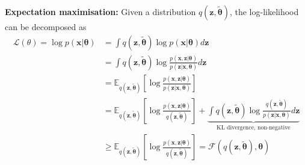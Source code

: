 \documentclass[12pt]{article}
\begin{document}
\textbf{Expectation maximisation:} Given a distribution $q(\boldsymbol{z},\boldsymbol{\tilde{\theta}})$, the log-likelihood can be decomposed as
\begin{align*}
    \mathcal{L}(\theta) = \log p(\boldsymbol{x} | \boldsymbol{\theta}) &= \int q(\boldsymbol{z},\boldsymbol{\tilde{\theta}}) \log p(\boldsymbol{x} | \boldsymbol{\theta}) d\boldsymbol{z} \\
    &= \int q(\boldsymbol{z},\boldsymbol{\tilde{\theta}}) \log \frac{p(\boldsymbol{x}, \boldsymbol{z} | \boldsymbol{\theta})}{p(\boldsymbol{z} | \boldsymbol{x}, \boldsymbol{\theta})} d\boldsymbol{z} \\
    &= \mathbb{E}_{q(\boldsymbol{z},\boldsymbol{\tilde{\theta}})}\left[ \log \frac{p(\boldsymbol{x}, \boldsymbol{z} | \boldsymbol{\theta})}{p(\boldsymbol{z} | \boldsymbol{x}, \boldsymbol{\theta})}\right] \\
    &= \mathbb{E}_{q(\boldsymbol{z},\boldsymbol{\tilde{\theta}})}\left[ \log \frac{p(\boldsymbol{x}, \boldsymbol{z} | \boldsymbol{\theta})}{q(\boldsymbol{z},\boldsymbol{\tilde{\theta}})}\right] + \underbrace{\int q(\boldsymbol{z},\boldsymbol{\tilde{\theta}}) \log \frac{q(\boldsymbol{z},\boldsymbol{\tilde{\theta}})}{p(\boldsymbol{z} | \boldsymbol{x}, \boldsymbol{\theta})} d\boldsymbol{z}}_{\text{KL divergence, non-negative}} \\
    &\geq \mathbb{E}_{q(\boldsymbol{z},\boldsymbol{\tilde{\theta}})}\left[ \log \frac{p(\boldsymbol{x}, \boldsymbol{z} | \boldsymbol{\theta})}{q(\boldsymbol{z},\boldsymbol{\tilde{\theta}})}\right] = \mathcal{F}(q(\boldsymbol{z},\boldsymbol{\tilde{\theta}}), \boldsymbol{\theta})
\end{align*}
\end{document}
